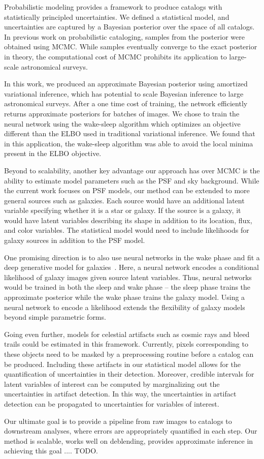 Probabilistic modeling provides a framework to 
produce catalogs with statistically principled uncertainties.
We defined a statistical model, and uncertainties are captured by a Bayesian posterior over the space of all catalogs.
In previous work on probabilistic cataloging, samples from the posterior were obtained using MCMC. 
While samples eventually converge to the exact posterior in theory, the computational cost of MCMC prohibits its application to large-scale astronomical surveys. 

In this work, we produced an approximate Bayesian posterior using amortized variational inference, which has potential to scale Bayesian inference to large astronomical surveys.
After a one time cost of training, the network efficiently returns approximate posteriors for batches of images.
We chose to train the neural network using the wake-sleep algorithm which optimizes an objective different than the ELBO used in traditional variational inference. 
We found that in this application, the wake-sleep algorithm was able to avoid the local minima present in the ELBO objective. 

Beyond to scalability, another key advantage our approach has over MCMC is the ability to estimate model parameters such as the PSF and sky background.
While the current work focuses on PSF models, our method can be extended to more general sources such as galaxies.
Each source would have an additional latent variable specifying whether it is a star or galaxy. If the source is a galaxy, it would have latent variables describing its shape in addition to its location, flux, and color variables. The statistical model would need to include likelihoods for galaxy sources in addition to the PSF model.

One promising direction is to also use neural networks in the wake phase and fit a deep generative model for galaxies~\cite{Regier2015ADG}. Here, a neural network encodes a conditional likelihood of galaxy images given source latent variables. Thus, neural networks would be trained in both the sleep and wake phase -- the sleep phase trains the approximate posterior while the wake phase trains the galaxy model. Using a neural network to encode a likelihood extends the flexibility of galaxy models beyond simple parametric forms. 

Going even further, models for celestial artifacts such as cosmic rays and bleed trails could be estimated in this framework.
Currently, pixels corresponding to these objects need to be masked by a preprocessing routine before a catalog can be produced. 
Including these artifacts in our statistical model allows for the quantification of uncertainties in their detection. 
Moreover, credible intervals for latent variables of interest can be computed by marginalizing out the uncertainties in artifact detection. 
In this way, the uncertainties in artifact detection can be propagated to uncertainties for variables of interest. 

Our ultimate goal is to provide a pipeline from raw images to catalogs to downstream analyses, where errors are appropriately quantified in each step. Our method is scalable, works well on deblending, provides approximate inference in achieving this goal .... TODO. 